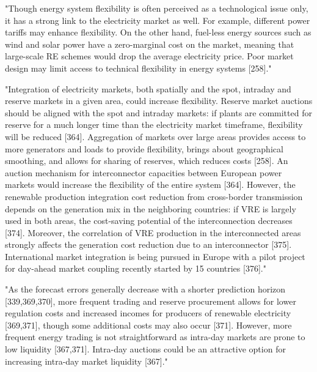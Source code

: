 "Though energy system flexibility is often perceived as a technological issue only, it has a strong link to the electricity market as well. For example, different power tariffs may enhance flexibility. On the other hand, fuel-less energy sources such as wind and solar power have a zero-marginal cost on the market, meaning that large-scale RE schemes would drop the average electricity price. Poor market design may limit access to technical flexibility in energy systems [258]." \cite{lund_review_2015}

"Integration of electricity markets, both spatially and the spot, intraday and reserve markets in a given area, could increase flexibility. Reserve market auctions should be aligned with the spot and intraday markets: if plants are committed for reserve for a much longer time than the electricity market timeframe, flexibility will be reduced [364]. Aggregation of markets over large areas provides access to more generators and loads to provide flexibility, brings about geographical smoothing, and allows for sharing of reserves, which reduces costs [258]. An auction mechanism for interconnector capacities between European power markets would increase the flexibility of the entire system [364]. However, the renewable production integration cost reduction from cross-border transmission depends on the generation mix in the neighboring countries: if VRE is largely used in both areas, the cost-saving potential of the interconnection decreases [374]. Moreover, the correlation of VRE production in the interconnected areas strongly affects the generation cost reduction due to an interconnector [375]. International market integration is being pursued in Europe with a pilot project for day-ahead market coupling recently started by 15 countries [376]." \cite{lund_review_2015}

"As the forecast errors generally decrease with a shorter prediction horizon [339,369,370], more frequent trading and reserve procurement allows for lower regulation costs and increased incomes for producers of renewable electricity [369,371], though some additional costs may also occur [371]. However, more frequent energy trading is not straightforward as intra-day markets are prone to low liquidity [367,371]. Intra-day auctions could be an attractive option for increasing intra-day market liquidity [367]." \cite{lund_review_2015}

